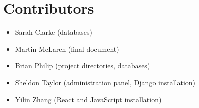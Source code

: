 \documentclass[11pt]{article}
\begin{document}
\pagebreak

\section*{Contributors}

\begin{itemize}
    \item Sarah Clarke (databases)
    \item Martin McLaren (final document)
    \item Brian Philip (project directories, databases)
    \item Sheldon Taylor (administration panel, Django installation)
    \item Yilin Zhang (React and JavaScript installation)
\end{itemize}
\end{document}
